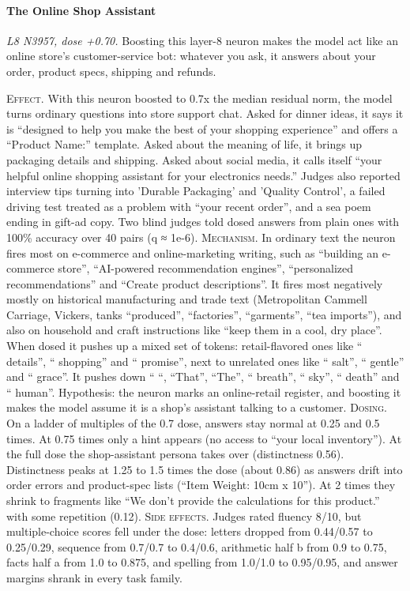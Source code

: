 \paragraph{The Online Shop Assistant} \textit{L8 N3957, dose +0.70.} Boosting this layer-8 neuron makes the model act like an online store's customer-service bot: whatever you ask, it answers about your order, product specs, shipping and refunds.

\noindent\textsc{Effect.} With this neuron boosted to 0.7x the median residual norm, the model turns ordinary questions into store support chat. Asked for dinner ideas, it says it is “designed to help you make the best of your shopping experience” and offers a “Product Name:” template. Asked about the meaning of life, it brings up packaging details and shipping. Asked about social media, it calls itself “your helpful online shopping assistant for your electronics needs.” Judges also reported interview tips turning into 'Durable Packaging' and 'Quality Control', a failed driving test treated as a problem with “your recent order”, and a sea poem ending in gift-ad copy. Two blind judges told dosed answers from plain ones with 100\% accuracy over 40 pairs (q ≈ 1e-6). \textsc{Mechanism.} In ordinary text the neuron fires most on e-commerce and online-marketing writing, such as “building an e-commerce store”, “AI-powered recommendation engines”, “personalized recommendations” and “Create product descriptions”. It fires most negatively mostly on historical manufacturing and trade text (Metropolitan Cammell Carriage, Vickers, tanks “produced”, “factories”, “garments”, “tea imports”), and also on household and craft instructions like “keep them in a cool, dry place”. When dosed it pushes up a mixed set of tokens: retail-flavored ones like “ details”, “ shopping” and “ promise”, next to unrelated ones like “ salt”, “ gentle” and “ grace”. It pushes down “ “, “That”, “The”, “ breath”, “ sky”, “ death” and “ human”. Hypothesis: the neuron marks an online-retail register, and boosting it makes the model assume it is a shop's assistant talking to a customer. \textsc{Dosing.} On a ladder of multiples of the 0.7 dose, answers stay normal at 0.25 and 0.5 times. At 0.75 times only a hint appears (no access to “your local inventory”). At the full dose the shop-assistant persona takes over (distinctness 0.56). Distinctness peaks at 1.25 to 1.5 times the dose (about 0.86) as answers drift into order errors and product-spec lists (“Item Weight: 10cm x 10”). At 2 times they shrink to fragments like “We don't provide the calculations for this product.” with some repetition (0.12). \textsc{Side effects.} Judges rated fluency 8/10, but multiple-choice scores fell under the dose: letters dropped from 0.44/0.57 to 0.25/0.29, sequence from 0.7/0.7 to 0.4/0.6, arithmetic half b from 0.9 to 0.75, facts half a from 1.0 to 0.875, and spelling from 1.0/1.0 to 0.95/0.95, and answer margins shrank in every task family.

